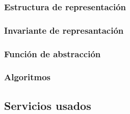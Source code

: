 \subsubsection{Estructura de representación}

\subsubsection{Invariante de represantación}

\subsubsection{Función de abstracción}

\subsubsection{Algoritmos}

\subsection{Servicios usados}

